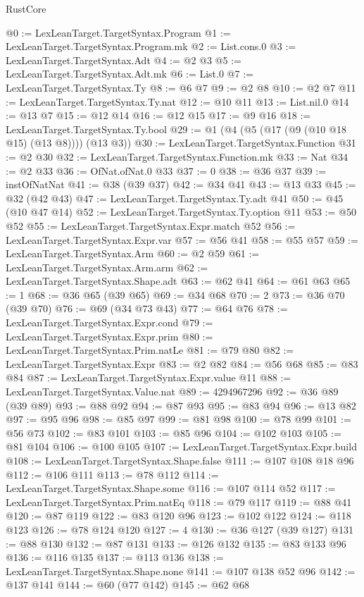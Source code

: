\begin{lexlean}{RustCore}
\begin{coremodule}
@0 := LexLeanTarget.TargetSyntax.Program
@1 := LexLeanTarget.TargetSyntax.Program.mk
@2 := List.cons.{0}
@3 := LexLeanTarget.TargetSyntax.Adt
@4 := @2 @3
@5 := LexLeanTarget.TargetSyntax.Adt.mk
@6 := List.{0}
@7 := LexLeanTarget.TargetSyntax.Ty
@8 := @6 @7
@9 := @2 @8
@10 := @2 @7
@11 := LexLeanTarget.TargetSyntax.Ty.nat
@12 := @10 @11
@13 := List.nil.{0}
@14 := @13 @7
@15 := @12 @14
@16 := @12 @15
@17 := @9 @16
@18 := LexLeanTarget.TargetSyntax.Ty.bool
@29 := @1 (@4 (@5 (@17 (@9 (@10 @18 @15) (@13 @8)))) (@13 @3))
@30 := LexLeanTarget.TargetSyntax.Function
@31 := @2 @30
@32 := LexLeanTarget.TargetSyntax.Function.mk
@33 := Nat
@34 := @2 @33
@36 := OfNat.ofNat.{0} @33
@37 := 0
@38 := @36 @37
@39 := instOfNatNat
@41 := @38 (@39 @37)
@42 := @34 @41
@43 := @13 @33
@45 := @32 (@42 @43)
@47 := LexLeanTarget.TargetSyntax.Ty.adt @41
@50 := @45 (@10 @47 @14)
@52 := LexLeanTarget.TargetSyntax.Ty.option @11
@53 := @50 @52
@55 := LexLeanTarget.TargetSyntax.Expr.match @52
@56 := LexLeanTarget.TargetSyntax.Expr.var
@57 := @56 @41
@58 := @55 @57
@59 := LexLeanTarget.TargetSyntax.Arm
@60 := @2 @59
@61 := LexLeanTarget.TargetSyntax.Arm.arm
@62 := LexLeanTarget.TargetSyntax.Shape.adt
@63 := @62 @41
@64 := @61 @63
@65 := 1
@68 := @36 @65 (@39 @65)
@69 := @34 @68
@70 := 2
@73 := @36 @70 (@39 @70)
@76 := @69 (@34 @73 @43)
@77 := @64 @76
@78 := LexLeanTarget.TargetSyntax.Expr.cond
@79 := LexLeanTarget.TargetSyntax.Expr.prim
@80 := LexLeanTarget.TargetSyntax.Prim.natLe
@81 := @79 @80
@82 := LexLeanTarget.TargetSyntax.Expr
@83 := @2 @82
@84 := @56 @68
@85 := @83 @84
@87 := LexLeanTarget.TargetSyntax.Expr.value @11
@88 := LexLeanTarget.TargetSyntax.Value.nat
@89 := 4294967296
@92 := @36 @89 (@39 @89)
@93 := @88 @92
@94 := @87 @93
@95 := @83 @94
@96 := @13 @82
@97 := @95 @96
@98 := @85 @97
@99 := @81 @98
@100 := @78 @99
@101 := @56 @73
@102 := @83 @101
@103 := @85 @96
@104 := @102 @103
@105 := @81 @104
@106 := @100 @105
@107 := LexLeanTarget.TargetSyntax.Expr.build
@108 := LexLeanTarget.TargetSyntax.Shape.false
@111 := @107 @108 @18 @96
@112 := @106 @111
@113 := @78 @112
@114 := LexLeanTarget.TargetSyntax.Shape.some
@116 := @107 @114 @52
@117 := LexLeanTarget.TargetSyntax.Prim.natEq
@118 := @79 @117
@119 := @88 @41
@120 := @87 @119
@122 := @83 @120 @96
@123 := @102 @122
@124 := @118 @123
@126 := @78 @124 @120
@127 := 4
@130 := @36 @127 (@39 @127)
@131 := @88 @130
@132 := @87 @131
@133 := @126 @132
@135 := @83 @133 @96
@136 := @116 @135
@137 := @113 @136
@138 := LexLeanTarget.TargetSyntax.Shape.none
@141 := @107 @138 @52 @96
@142 := @137 @141
@144 := @60 (@77 @142)
@145 := @62 @68

\end{coremodule}
\end{lexlean}
